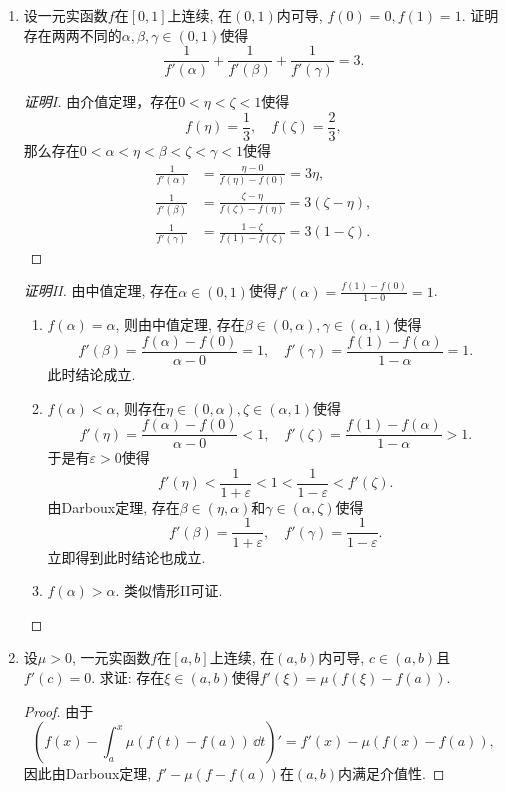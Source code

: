 \begin{4a}
\begin{enumerate}
\begin{proof}
\[\begin{cases}
f'(a),& x=a\end{cases},\]
则 $g(x)$ 在 $[a,b]$ 上连续，在 $(a,b)$ 上可导。
假设 $g^{\prime}(x)$ 在 $(a,b)$ 上没有零点，则其恒正或恒负，
不妨设其恒正，则 $g(x)$ 在 $[a,b]$ 上严格递增，则有
\[\frac{f(x)-f(a)}{x-a}<\frac{f(b)-f(a)}{b-a},\quad\forall\,x\in(a,b).\]
此式可化为
\[f(x)-(x-a) \frac{f(b)-f(x)}{b-x}<f(a),\quad\forall\,x\in(a,b),\]
令 $x \rightarrow b^{-}$，有
\[f(b)-(b-a) f^{\prime}(b) \leqslant f(a),\]
所以有
\[g(b)=\frac{f(b)-f(a)}{b-a} \leqslant f'(b)=f'(a)=g(a),\]
矛盾。故 $g'(x)$ 在 $(a,b)$ 上有零点，
记为 $g'(\xi)=0$，其中 $\xi \in (a, b)$。由于
\[g'(x)=\frac{(x-a) f^{\prime}(x)-f(x)+f(a)}{(x-a)^2},\]
故 $f'(\xi)=\dfrac{f(\xi)-f(a)}{\xi-a}$。
\end{proof}
\item 设一元实函数\(f\)在\([0,1]\)上连续, 在\((0,1)\)内可导, \(f(0)=0,f(1)=1\). 
证明存在两两不同的\(\alpha,\beta,\gamma\in (0,1)\)使得
\[\frac{1}{f'(\alpha)}+\frac{1}{f'(\beta)}+\frac{1}{f'(\gamma)}=3.\]
\begin{proof}[证明I]
    由介值定理，存在$0<\eta<\zeta<1$使得
\[f(\eta)=\frac{1}{3}, \quad f(\zeta)=\frac{2}{3},\]
那么存在$0<\alpha<\eta<\beta<\zeta<\gamma<1$使得
\begin{align*}
    \frac{1}{f'(\alpha)}&=\frac{\eta-0}{f(\eta)-f(0)}=3\eta,\\
    \frac{1}{f'(\beta)}&=\frac{\zeta-\eta}{f(\zeta)-f(\eta)}=3(\zeta-\eta),\\
    \frac{1}{f'(\gamma)}&=\frac{1-\zeta}{f(1)-f(\zeta)}=3(1-\zeta).
\end{align*}
\end{proof}
\begin{proof}[证明II]
由中值定理, 存在\(\alpha\in(0,1)\)使得\(f'(\alpha)=\frac{f(1)-f(0)}{1-0}=1\).
\begin{enumerate}[label=(\Roman*)]
\item \(f(\alpha)=\alpha\), 则由中值定理, 存在\(\beta\in(0,\alpha),\gamma\in(\alpha,1)\)使得
\[f'(\beta)=\frac{f(\alpha)-f(0)}{\alpha-0}=1,\quad f'(\gamma)=\frac{f(1)-f(\alpha)}{1-\alpha}=1.\]此时结论成立.
\item \(f(\alpha)<\alpha\), 则存在\(\eta\in(0,\alpha),\zeta\in(\alpha,1)\)使得
\[f'(\eta)=\frac{f(\alpha)-f(0)}{\alpha-0}<1,\quad f'(\zeta)=\frac{f(1)-f(\alpha)}{1-\alpha}>1.\]
于是有\(\varepsilon>0\)使得
\[f'(\eta)<\frac{1}{1+\varepsilon}<1<\frac{1}{1-\varepsilon}<f'(\zeta).\]
由Darboux定理, 存在\(\beta\in(\eta,\alpha)\)和\(\gamma\in(\alpha,\zeta)\)使得
\[f'(\beta)=\frac{1}{1+\varepsilon},\quad f'(\gamma)=\frac{1}{1-\varepsilon}.\]
立即得到此时结论也成立.
\item \(f(\alpha)>\alpha\). 类似情形II可证.\qedhere
\end{enumerate}
\end{proof}
\item 设\(\mu>0\), 一元实函数\(f\)在\([a,b]\)上连续, 在\((a,b)\)内可导, \(c\in(a,b)\)且\(f'(c)=0\). 
求证: 存在\(\xi\in(a,b)\)使得\(f'(\xi)=\mu(f(\xi)-f(a))\).
\begin{proof}
由于\[\left(f(x)-\int_{a}^{x}\mu(f(t)-f(a))\,\dd t\right)'=f'(x)-\mu(f(x)-f(a)),\]
因此由Darboux定理, \(f'-\mu(f-f(a))\)在\((a,b)\)内满足介值性. 


\end{proof}
\end{enumerate}
\end{4a}
